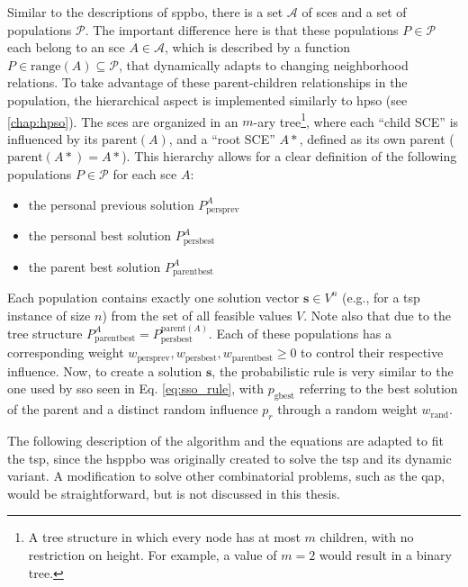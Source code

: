 Similar to the descriptions of \gls{sppbo}, there is a set $\mathcal{A}$ of \glspl{sce} and a set of populations $\mathcal{P}$. The important difference here is that these populations $P \in \mathcal{P}$ each belong to an \gls{sce} $A \in \mathcal{A}$, which is described by a function $P\in \text{range}(A) \subseteq \mathcal{P}$, that dynamically adapts to changing neighborhood relations. To take advantage of these parent-children relationships in the population, the hierarchical aspect is implemented similarly to \gls{hpso} (see \cref{chap:hpso}). The \glspl{sce} are organized in an $m$-ary tree\footnote{A tree structure in which every node has at most $m$ children, with no restriction on height. For example, a value of $m=2$ would result in a binary tree.}, where each \enquote{child SCE} is influenced by its $\text{parent}(A)$, and a \enquote{root SCE} $A*$, defined as its own parent ($\text{parent}(A*) = A*$). This hierarchy allows for a clear definition of the following populations $P\in \mathcal{P}$ for each \gls{sce} $A$:
\begin{itemize}
	\item the personal previous solution $P^{A}_{\text{persprev}}$
	\item the personal best solution $P^{A}_{\text{persbest}}$
	\item the parent best solution $P^{A}_{\text{parentbest}}$
\end{itemize}
Each population contains exactly one solution vector $\mathbf{s} \in V^n$ (e.g., for a \gls{tsp} instance of size $n$) from the set of all feasible values $V$. Note also that due to the tree structure $P^{A}_{\text{parentbest}} = P^{\text{parent}(A)}_{\text{persbest}}$. Each of these populations has a corresponding weight $w_{\text{persprev}}, w_{\text{persbest}}, w_{\text{parentbest}} \geq 0$ to control their respective influence. 
Now, to create a solution $\mathbf{s}$, the probabilistic rule is very similar to the one used by \gls{sso} seen in Eq. \eqref{eq:sso_rule}, with $p_{\text{gbest}}$ referring to the best solution of the parent and a distinct random influence $p_r$ through a random weight $w_\text{rand}$.

The following description of the algorithm and the equations are adapted to fit the \gls{tsp}, since the \gls{hsppbo} was originally created to solve the \gls{tsp} and its dynamic variant. A modification to solve other combinatorial problems, such as the \gls{qap}, would be straightforward, but is not discussed in this thesis.

